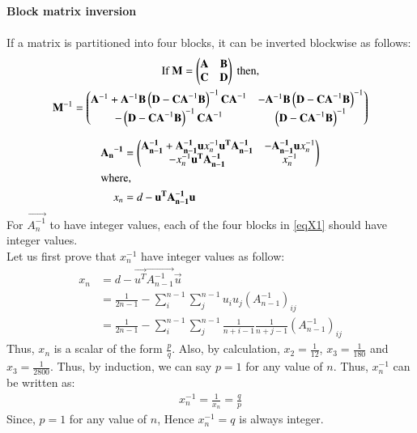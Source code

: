 \documentclass[journal,12pt,twocolumn]{IEEEtran}
\begin{document}
\begin{mdframed}
\textbf{Block matrix inversion} \\ \\
If a matrix is partitioned into four blocks, it can be inverted blockwise as follows:
{\scriptsize 
\begin{gather}
    \text{If } \mathbf{M}=
    \begin{pmatrix}\mathbf{A} &\mathbf{B} \\\mathbf{C} &\mathbf{D}\end{pmatrix} \text{ then,} \nonumber \\
    \mathbf{M}^{-1}=\begin{pmatrix}\mathbf {A} ^{-1}+\mathbf {A} ^{-1}\mathbf {B} \left(\mathbf {D} -\mathbf {CA} ^{-1}\mathbf {B} \right)^{-1}\mathbf {CA} ^{-1}&-\mathbf {A} ^{-1}\mathbf {B} \left(\mathbf {D} -\mathbf {CA} ^{-1}\mathbf {B} \right)^{-1}\\-\left(\mathbf {D} -\mathbf {CA} ^{-1}\mathbf {B} \right)^{-1}\mathbf {CA} ^{-1}&\left(\mathbf {D} -\mathbf {CA} ^{-1}\mathbf {B} \right)^{-1}\end{pmatrix}
\end{gather}
}%
\end{mdframed}
\begin{align}
    \mathbf{{A_n}^{-1}} &= \begin{pmatrix}\mathbf{A_{n-1}^{-1}}+\mathbf{A_{n-1}^{-1}}\mathbf{u}x_n^{-1}\mathbf{u^T}\mathbf{A_{n-1}^{-1}} & -\mathbf{A_{n-1}^{-1}}\mathbf{u}x_n^{-1}\\-x_n^{-1}\mathbf{u^T}\mathbf{A_{n-1}^{-1}} & x_n^{-1}\end{pmatrix}\\
\intertext{where,}
x_n &= d-\mathbf{u^T}\mathbf{A_{n-1}^{-1}}\mathbf{u}\label{eqX1}
\end{align}
For $\vec{A_{n}^{-1}}$ to have integer values, each of the four blocks in \eqref{eqX1} should have integer values.\\
Let us first prove that $x_n^{-1}$ have integer values as follow:
\begin{align}
    x_n &= d-\vec{u^T}\vec{A_{n-1}^{-1}}\vec{u}\\
    &=\frac{1}{2n-1}-\sum_i ^{n-1}\sum_j^{n-1} u_iu_j (A_{n-1}^{-1})_{ij}\\
    &=\frac{1}{2n-1}-\sum_i ^{n-1}\sum_j^{n-1} \frac{1}{n+i-1}\frac{1}{n+j-1}(A_{n-1}^{-1})_{ij}
\end{align}
Thus, $x_n$ is a scalar of the form $\frac{p}{q}$. Also, by calculation, $x_2=\frac{1}{12}$, $x_3=\frac{1}{180}$ and $x_3=\frac{1}{2800}$. Thus, by induction, we can say $p=1$ for any value of $n$. Thus, $x_n^{-1}$ can be written as:
\begin{align}
    x_n^{-1}=\frac{1}{x_n}=\frac{q}{p}
\end{align}
Since, $p=1$ for any value of $n$, Hence $x_n^{-1}=q$ is always integer.\\ \\
\end{document}

